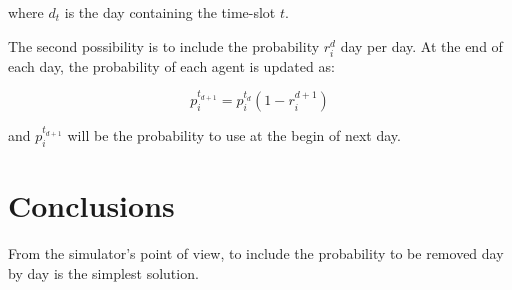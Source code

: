 \documentclass[12pt, a4paper]{article}
\newcommand{\expr}[1]{\left(#1\right)}
\begin{document}
where $d_t$ is the day containing the time-slot $t$.

The second possibility is to include the probability $r^{d}_i$ day per day. At the end of each day, the probability of each agent is updated as:

\begin{equation}
     p_i^{t_{d+1}} = p_i^{t_d}\expr{1 - r^{d+1}_i}
\end{equation}

and $p_i^{t_{d+1}}$ will be the probability to use at the begin of next day.


\section{Conclusions}

From the simulator's point of view, to include the probability to be removed day by day is the simplest solution.
\end{document}
